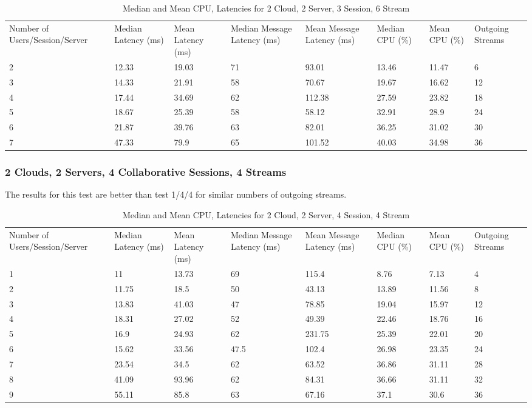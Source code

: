 \begin{table}
\caption{Median and Mean CPU, Latencies for 2 Cloud, 2 Server, 3 Session, 6 Stream}
\label{table:2cld_2serv_3sess_6str}
\begin{tabu} to\linewidth{|X[c]|X[c]|X[c]|X[c]|X[c]|X[c]|X[c]|X[c]|}
\everyrow{\hline}
\hline
Number of Users/Session/Server & Median Latency (ms) & Mean Latency (ms) & Median Message Latency (ms) & Mean Message Latency (ms) & Median CPU (\%) & Mean CPU (\%) & Outgoing Streams\\
2 & 12.33 & 19.03 & 71 & 93.01 & 13.46 & 11.47 & 6 \\
3 & 14.33 & 21.91 & 58 & 70.67 & 19.67 & 16.62 & 12 \\
4 & 17.44 & 34.69 & 62 & 112.38 & 27.59 & 23.82 & 18 \\
5 & 18.67 & 25.39 & 58 & 58.12 & 32.91 & 28.9 & 24 \\
6 & 21.87 & 39.76 & 63 & 82.01 & 36.25 & 31.02 & 30 \\
7 & 47.33 & 79.9 & 65 & 101.52 & 40.03 & 34.98 & 36 \\
\end{tabu}
\end{table}

\clearpage\subsubsection{2 Clouds, 2 Servers, 4 Collaborative Sessions, 4 Streams}

The results for this test are better than test 1/4/4 for similar numbers of outgoing streams.

\begin{table}
\caption{Median and Mean CPU, Latencies for 2 Cloud, 2 Server, 4 Session, 4 Stream}
\label{table:2cld_2serv_4sess_4str}
\begin{tabu} to\linewidth{|X[c]|X[c]|X[c]|X[c]|X[c]|X[c]|X[c]|X[c]|}
\everyrow{\hline}
\hline
Number of Users/Session/Server & Median Latency (ms) & Mean Latency (ms) & Median Message Latency (ms) & Mean Message Latency (ms) & Median CPU (\%) & Mean CPU (\%) & Outgoing Streams\\
1 & 11 & 13.73 & 69 & 115.4 & 8.76 & 7.13 & 4 \\
2 & 11.75 & 18.5 & 50 & 43.13 & 13.89 & 11.56 & 8 \\
3 & 13.83 & 41.03 & 47 & 78.85 & 19.04 & 15.97 & 12 \\
4 & 18.31 & 27.02 & 52 & 49.39 & 22.46 & 18.76 & 16 \\
5 & 16.9 & 24.93 & 62 & 231.75 & 25.39 & 22.01 & 20 \\
6 & 15.62 & 33.56 & 47.5 & 102.4 & 26.98 & 23.35 & 24 \\
7 & 23.54 & 34.5 & 62 & 63.52 & 36.86 & 31.11 & 28 \\
8 & 41.09 & 93.96 & 62 & 84.31 & 36.66 & 31.11 & 32 \\
9 & 55.11 & 85.8 & 63 & 67.16 & 37.1 & 30.6 & 36 \\
\end{tabu}
\end{table}

